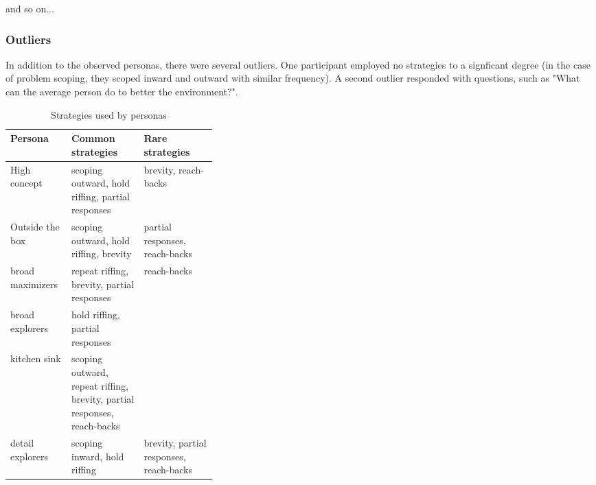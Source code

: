 and so on...

\subsubsection{Outliers}

In addition to the observed personas, there were several outliers. One participant employed no strategies to a signficant degree (in the case of problem scoping, they scoped inward and outward with similar frequency). A second outlier responded with questions, such as "What can the average person do to better the environment?".

\begin{table*}
    \begin{tabular}{|l|p{0.35\linewidth}|l|}
        \hline
        \textbf{Persona} & \textbf{Common strategies} & \textbf{Rare strategies} \\
        \hline
        High concept & scoping outward, hold riffing, partial responses & brevity, reach-backs \\
        \hline
        Outside the box & scoping outward, hold riffing, brevity & partial responses, reach-backs \\
        \hline
        broad maximizers & repeat riffing, brevity, \newline
        partial responses  & reach-backs \\ 
        \hline
        broad explorers & hold riffing, partial responses & \\
        \hline
        kitchen sink & scoping outward, repeat riffing, brevity, \newline
        partial responses, reach-backs & \\ 
        \hline
        detail explorers & scoping inward, hold riffing & brevity, partial responses, reach-backs\\
        \hline
    \end{tabular}
    \caption{Strategies used by personas}
\end{table*}
